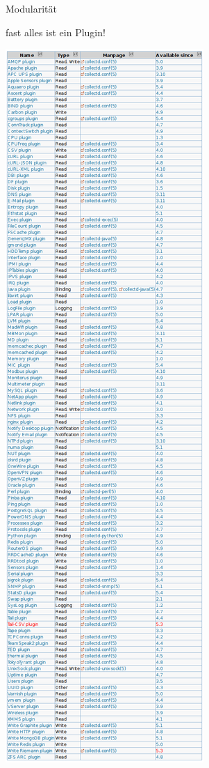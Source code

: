 \documentclass[ngerman,compress,aspectratio=169]{beamer}
\begin{document}
\begin{frame}{Modularit\"at}
	\begin{center}
		fast alles ist ein Plugin!
	\end{center}
	\begin{center}
		\includegraphics[scale=0.40]{plugins}
	\end{center}
\end{frame}
\end{document}

